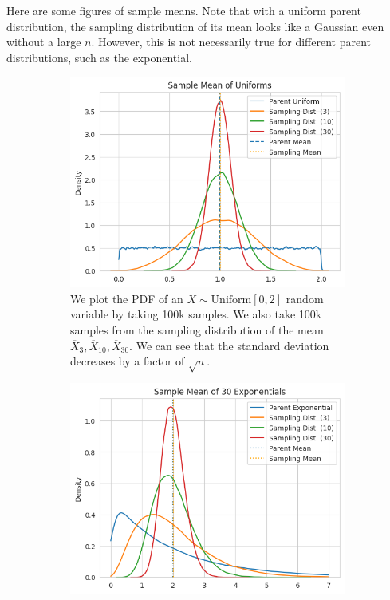 \documentclass{article}
\begin{document}
    \begin{example}
      Here are some figures of sample means. Note that with a uniform parent distribution, the sampling distribution of its mean looks like a Gaussian even without a large $n$. However, this is not necessarily true for different parent distributions, such as the exponential. 
      \begin{figure}[H]
        \centering
        \begin{subfigure}[b]{0.48\textwidth}
        \centering
          \includegraphics[width=\textwidth]{img/sample_mean_uniform.png}
          \caption{We plot the PDF of an $X \sim \mathrm{Uniform}[0, 2]$ random variable by taking 100k samples. We also take 100k samples from the sampling distribution of the mean $\overline{X}_{3}, \overline{X}_{10}, \overline{X}_{30}$. We can see that the standard deviation decreases by a factor of $\sqrt{n}$.}
          \label{fig:sample_mean_uniform}
        \end{subfigure}
        \hfill 
        \begin{subfigure}[b]{0.48\textwidth}
        \centering
          \includegraphics[width=\textwidth]{img/sample_mean_exp.png}

\end{subfigure}
\end{figure}
\end{example}
\end{document}
